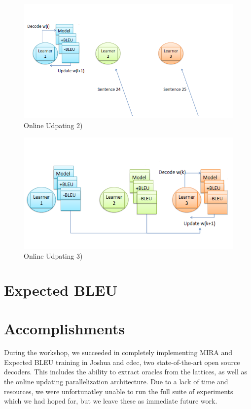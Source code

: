\begin{figure}[h]
	\centering
		\includegraphics[scale=0.5]{training_img_files/update2.PNG}
	\caption{Online Udpating 2)}
	\label{fig:update2}
\end{figure}


\begin{figure}[h]
	\centering
		\includegraphics[scale=0.5]{training_img_files/update3.PNG}
	\caption{Online Udpating 3)}
	\label{fig:update3}
\end{figure}

\section{Expected BLEU}
\label{sec:exp_bleu
}
\section{Accomplishments}
During the workshop, we succeeded in completely implementing MIRA and Expected BLEU training in Joshua and cdec, two state-of-the-art open source decoders. This includes the ability to extract oracles from the lattices, as well as the online updating parallelization architecture. Due to a lack of time and resources, we were unfortunatley unable to run the full suite of experiments which we had hoped for, but we leave these as immediate future work.

